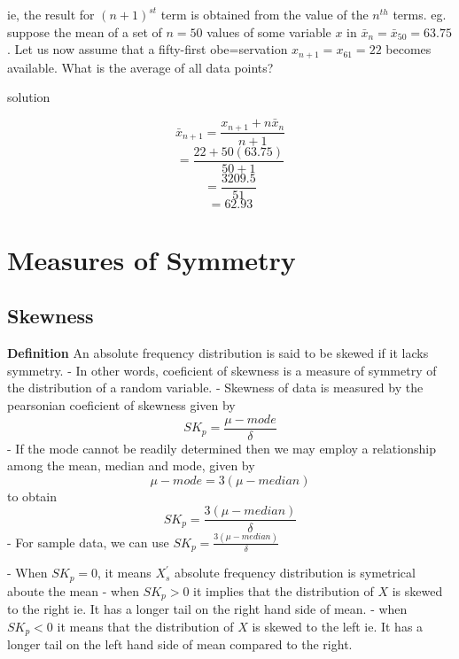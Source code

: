 \documentclass[12pt]{article}
\begin{document}
ie, the result for $(n + 1)^{st}$ term is obtained from the value of the $n^{th}$ terms.
eg. suppose the mean of a set of $n = 50$ values of some variable $x$ in $\bar{x}_n = \bar{x}_{50} = 63.75$. Let us now assume that a fifty-first obe=servation $x_{n + 1} = x_{61} = 22$ becomes available. What is the average of all data points?

solution



\begin{center}
    \[\bar{x}_{n + 1} = \frac{x_{n+1} + n\bar{x}_n}{n + 1}\]
    \[= \frac{22 + 50(63.75)}{50 + 1}\]
    \[= \frac{3209.5}{51}\]
    \[= 62.93\]
\end{center}



\section{Measures of Symmetry}
\subsection{Skewness}
\textbf{Definition} An absolute frequency distribution is said to be skewed if it lacks symmetry.
- In other words, coeficient of skewness is a measure of symmetry of the distribution of a random variable.
- Skewness of data is measured by the pearsonian coeficient of skewness given by
\begin{equation}
    SK_p = \frac{\mu - mode}{\delta}
\end{equation}
- If the mode cannot be readily determined then we may employ a relationship among the mean, median and mode, given by
\begin{equation}
    \mu - mode = 3(\mu - median)
\end{equation}
to obtain
\begin{equation}
    SK_p = \frac{3(\mu - median)}{\delta}
\end{equation}
- For sample data, we can use $SK_p = \frac{3(\mu - median)}{\delta}$

- When $SK_p = 0$, it means $X_s^{'}$ absolute frequency distribution is symetrical aboute the mean
- when $SK_p > 0$ it implies that the distribution of $X$ is skewed to the right ie. It has a longer tail on the right hand side of mean.
- when $SK_p < 0$ it means that the distribution of $X$ is skewed to the left ie. It has a longer tail on the left hand side of mean compared to the right.
\end{document}
